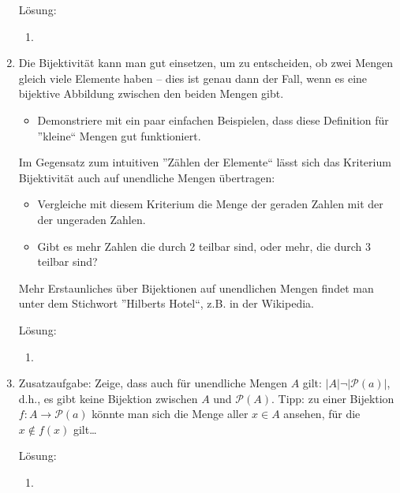 \documentclass[main.tex]{subfiles}
\begin{document}
\begin{enumerate}
	      Lösung:
	      \begin{enumerate}
		      \item
	      \end{enumerate}
	\item Die Bijektivität kann man gut einsetzen, um zu entscheiden, ob zwei Mengen
	      gleich viele Elemente haben – dies ist genau dann der Fall, wenn es eine
	      bijektive Abbildung zwischen den beiden Mengen gibt.
	      \begin{itemize}
		      \item Demonstriere mit ein paar einfachen Beispielen, dass diese Definition
		            für ”kleine“ Mengen gut funktioniert.
	      \end{itemize}
	      Im Gegensatz zum intuitiven ”Zählen der Elemente“ lässt sich das Kriterium
	      Bijektivität auch auf unendliche Mengen übertragen:
	      \begin{itemize}
		      \item Vergleiche mit diesem Kriterium die Menge der geraden Zahlen mit der
		            der ungeraden Zahlen.
		      \item Gibt es mehr Zahlen die durch 2 teilbar sind, oder mehr, die durch 3
		            teilbar sind?
	      \end{itemize}
	      Mehr Erstaunliches über Bijektionen auf unendlichen Mengen findet man unter dem Stichwort
	      ”Hilberts Hotel“, z.B. in der Wikipedia.

	      Lösung:
	      \begin{enumerate}
		      \item
	      \end{enumerate}
	\item  Zusatzaufgabe: Zeige, dass auch für unendliche Mengen \( A \) gilt: \( |A| \neg |\mathcal{P}(a)| \),
	      d.h., es gibt keine Bijektion zwischen \( A \) und \( \mathcal{P}(A) \).
	      Tipp: zu einer Bijektion \( f: A \rightarrow \mathcal{P}(a) \) könnte man sich die Menge aller
	      \( x \in A \) ansehen, für die \( x \notin f(x) \) gilt\dots

	      Lösung:
	      \begin{enumerate}
		      \item
	      \end{enumerate}
\end{enumerate}
\end{document}
